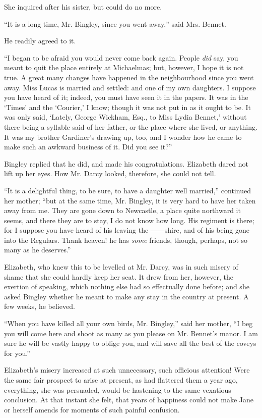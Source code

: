 \documentclass[12pt,openright]{book}
\begin{document}
She inquired after his sister, but could do no more.

“It is a long time, Mr. Bingley, since you went away,” said Mrs. Bennet.

He readily agreed to it.

“I began to be afraid you would never come back again. People \textit{did} say, you meant to quit the place entirely at Michaelmas; but, however, I hope it is not true. A great many changes have happened in the neighbourhood since you went away. Miss Lucas is married and settled: and one of my own daughters. I suppose you have heard of it; indeed, you must have seen it in the papers. It was in the ‘Times’ and the ‘Courier,’ I know; though it was not put in as it ought to be. It was only said, ‘Lately, George Wickham, Esq., to Miss Lydia Bennet,’ without there being a syllable said of her father, or the place where she lived, or anything. It was my brother Gardiner’s drawing up, too, and I wonder how he came to make such an awkward business of it. Did you see it?”

Bingley replied that he did, and made his congratulations. Elizabeth dared not lift up her eyes. How Mr. Darcy looked, therefore, she could not tell.

“It is a delightful thing, to be sure, to have a daughter well married,” continued her mother; “but at the same time, Mr. Bingley, it is very hard to have her taken away from me. They are gone down to Newcastle, a place quite northward it seems, and there they are to stay, I do not know how long. His regiment is there; for I suppose you have heard of his leaving the ——shire, and of his being gone into the Regulars. Thank heaven! he has \textit{some} friends, though, perhaps, not so many as he deserves.”

Elizabeth, who knew this to be levelled at Mr. Darcy, was in such misery of shame that she could hardly keep her seat. It drew from her, however, the exertion of speaking, which nothing else had so effectually done before; and she asked Bingley whether he meant to make any stay in the country at present. A few weeks, he believed.

“When you have killed all your own birds, Mr. Bingley,” said her mother, “I beg you will come here and shoot as many as you please on Mr. Bennet’s manor. I am sure he will be vastly happy to oblige you, and will save all the best of the coveys for you.”

Elizabeth’s misery increased at such unnecessary, such officious attention! Were the same fair prospect to arise at present, as had flattered them a year ago, everything, she was persuaded, would be hastening to the same vexatious conclusion. At that instant she felt, that years of happiness could not make Jane or herself amends for moments of such painful confusion.
\end{document}
